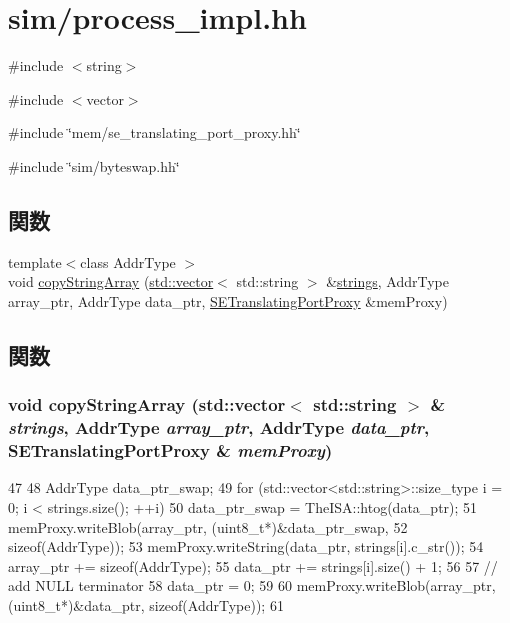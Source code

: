 \hypertarget{process__impl_8hh}{
\section{sim/process\_\-impl.hh}
\label{process__impl_8hh}
}
{\ttfamily \#include $<$string$>$}\par
{\ttfamily \#include $<$vector$>$}\par
{\ttfamily \#include \char`\"{}mem/se\_\-translating\_\-port\_\-proxy.hh\char`\"{}}\par
{\ttfamily \#include \char`\"{}sim/byteswap.hh\char`\"{}}\par
\subsection*{関数}
\begin{DoxyCompactItemize}
\item 
{\footnotesize template$<$class AddrType $>$ }\\void \hyperlink{process__impl_8hh_abbc13c6dc8f22fc451cf7a52ce997572}{copyStringArray} (\hyperlink{classstd_1_1vector}{std::vector}$<$ std::string $>$ \&\hyperlink{circletest_8cc_a899c0fa2b3c57dba6154c77de83c8d39}{strings}, AddrType array\_\-ptr, AddrType data\_\-ptr, \hyperlink{classSETranslatingPortProxy}{SETranslatingPortProxy} \&memProxy)
\end{DoxyCompactItemize}


\subsection{関数}
\hypertarget{process__impl_8hh_abbc13c6dc8f22fc451cf7a52ce997572}{
\subsubsection[{copyStringArray}]{\setlength{\rightskip}{0pt plus 5cm}void copyStringArray ({\bf std::vector}$<$ std::string $>$ \& {\em strings}, \/  AddrType {\em array\_\-ptr}, \/  AddrType {\em data\_\-ptr}, \/  {\bf SETranslatingPortProxy} \& {\em memProxy})}}
\label{process__impl_8hh_abbc13c6dc8f22fc451cf7a52ce997572}



\begin{DoxyCode}
47 {
48     AddrType data_ptr_swap;
49     for (std::vector<std::string>::size_type i = 0; i < strings.size(); ++i) {
50         data_ptr_swap = TheISA::htog(data_ptr);
51         memProxy.writeBlob(array_ptr, (uint8_t*)&data_ptr_swap,
52                 sizeof(AddrType));
53         memProxy.writeString(data_ptr, strings[i].c_str());
54         array_ptr += sizeof(AddrType);
55         data_ptr += strings[i].size() + 1;
56     }
57     // add NULL terminator
58     data_ptr = 0;
59 
60     memProxy.writeBlob(array_ptr, (uint8_t*)&data_ptr, sizeof(AddrType));
61 }
\end{DoxyCode}
